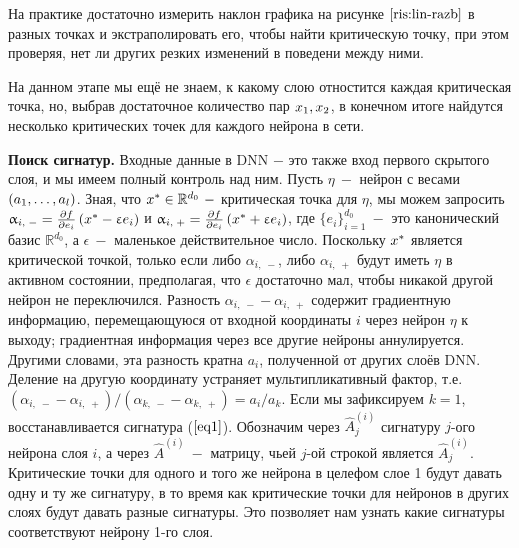 На практике достаточно измерить наклон графика на рисунке $\ref{ris:lin-razb}$ в разных точках и экстраполировать его, чтобы найти критическую точку, при этом проверяя, нет ли других резких изменений в поведени между ними.

На данном этапе мы ещё не знаем, к какому слою отностится каждая критическая точка, но, выбрав достаточное количество пар $\mathnormal{x}_{1}, \mathnormal{x}_{2}$, в конечном итоге найдутся несколько критических точек для каждого нейрона в сети.

\textbf{Поиск сигнатур.}  Входные данные в DNN $-$ это также вход первого скрытого слоя, и мы имеем полный контроль над ним. Пусть $\eta ~- $ нейрон с весами $\left( a_{1}, \dots, a_{\mathnormal{l}} \right)$. Зная, что $\mathnormal{x}^{*} \in \mathbb{R}^{d_{0}} ~-$ критическая точка для $\eta$, мы можем запросить $\alpha_{i,\;-} = \frac{\partial \mathnormal{f}}{\partial e_{i}}\left(\mathnormal{x}^{*} - \epsilon e_{i}\right)$ и $\alpha_{i,\;+} = \frac{\partial \mathnormal{f}}{\partial e_{i}}\left(\mathnormal{x}^{*} + \epsilon e_{i}\right)$, где $\{e_{i}\}_{i=1}^{d_{0}} ~-$ это канонический базис $\mathbb{R}^{d_{0}}$, а $\epsilon ~-$ маленькое действительное число. Поскольку $\mathnormal{x}^{*}$ является критической точкой, только если либо $\alpha_{i,\;-}$, либо $\alpha_{i,\;+}$ будут иметь $\eta$ в активном состоянии, предполагая, что $\epsilon$ достаточно мал, чтобы никакой другой нейрон не переключился. Разность $\alpha_{i,\;-} - \alpha_{i,\;+}$ содержит градиентную информацию, перемещающуюся от входной координаты $i$ через нейрон $\eta$ к выходу; градиентная информация через все другие нейроны аннулируется. Другими словами, эта разность кратна $a_{i}$, полученной от других слоёв DNN. Деление на другую координату устраняет мультипликативный фактор, т.е. $\left(\alpha_{i,\;-} - \alpha_{i,\;+}\right)/\left(\alpha_{k,\;-} - \alpha_{k,\;+}\right) = {a_{i}}/{a_{k}}$. Если мы зафиксируем $k=1$, восстанавливается сигнатура ($\ref{eq1}$). Обозначим через $\hat {A}_{j}^ {\left(i\right)}$ сигнатуру $j$-ого нейрона слоя $i$, а через $\hat {A} ^ {\left(i\right)} ~-$ матрицу, чьей $j$-ой строкой является $\hat {A}_{j}^ {\left(i\right)}$. Критические точки для одного и того же нейрона в целефом слое 1 будут давать одну и ту же сигнатуру, в то время как критические точки для нейронов в других слоях будут давать разные сигнатуры. Это позволяет нам узнать какие сигнатуры соответствуют нейрону 1-го слоя.

